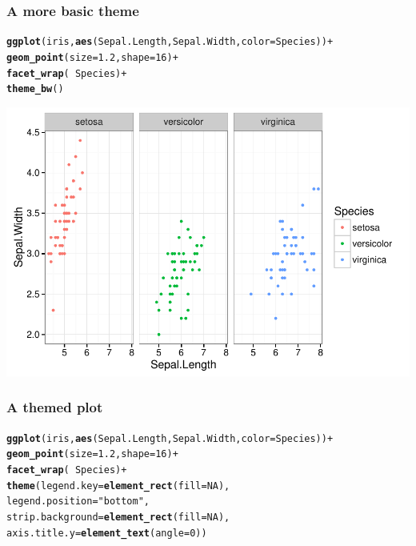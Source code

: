 \documentclass{beamer}\usepackage[]{graphicx}\usepackage[]{color}
\makeatletter
\newcommand{\hlnum}[1]{\textcolor[rgb]{0.686,0.059,0.569}{#1}}%
\newcommand{\hlstr}[1]{\textcolor[rgb]{0.192,0.494,0.8}{#1}}%
\newcommand{\hlopt}[1]{\textcolor[rgb]{0,0,0}{#1}}%
\newcommand{\hlstd}[1]{\textcolor[rgb]{0.345,0.345,0.345}{#1}}%
\newcommand{\hlkwc}[1]{\textcolor[rgb]{0.333,0.667,0.333}{#1}}%
\newcommand{\hlkwd}[1]{\textcolor[rgb]{0.737,0.353,0.396}{\textbf{#1}}}%
\newenvironment{kframe}{%
 \def\at@end@of@kframe{}%
 \ifinner\ifhmode%
  \def\at@end@of@kframe{\end{minipage}}%
  \begin{minipage}{\columnwidth}%
 \fi\fi%
 \def\FrameCommand##1{\hskip\@totalleftmargin \hskip-\fboxsep
 \colorbox{shadecolor}{##1}\hskip-\fboxsep
     \hskip-\linewidth \hskip-\@totalleftmargin \hskip\columnwidth}%
 \MakeFramed {\advance\hsize-\width
   \@totalleftmargin\z@ \linewidth\hsize
   \@setminipage}}%
 {\par\unskip\endMakeFramed%
 \at@end@of@kframe}
\newenvironment{knitrout}{}{} %
\makeatother
\begin{document}

\begin{frame}[fragile]
\frametitle{A more basic theme}
\begin{knitrout}\footnotesize
{}\color{fgcolor}\begin{kframe}
\begin{alltt}
\hlkwd{ggplot}\hlstd{(iris,} \hlkwd{aes}\hlstd{(Sepal.Length, Sepal.Width,} \hlkwc{color} \hlstd{= Species))} \hlopt{+}
    \hlkwd{geom_point}\hlstd{(}\hlkwc{size} \hlstd{=} \hlnum{1.2}\hlstd{,} \hlkwc{shape} \hlstd{=} \hlnum{16}\hlstd{)} \hlopt{+}
    \hlkwd{facet_wrap}\hlstd{(} \hlopt{~} \hlstd{Species)} \hlopt{+}
    \hlkwd{theme_bw}\hlstd{()}
\end{alltt}
\end{kframe}

{\centering \includegraphics[width=.75\linewidth]{figure/facet_wrapbw_theme-1} 

}



\end{knitrout}
\end{frame}


\begin{frame}[fragile]
\frametitle{A themed plot}
\begin{knitrout}\footnotesize
{}\color{fgcolor}\begin{kframe}
\begin{alltt}
\hlkwd{ggplot}\hlstd{(iris,} \hlkwd{aes}\hlstd{(Sepal.Length, Sepal.Width,} \hlkwc{color} \hlstd{= Species))} \hlopt{+}
    \hlkwd{geom_point}\hlstd{(}\hlkwc{size} \hlstd{=} \hlnum{1.2}\hlstd{,} \hlkwc{shape} \hlstd{=} \hlnum{16}\hlstd{)} \hlopt{+}
    \hlkwd{facet_wrap}\hlstd{(} \hlopt{~} \hlstd{Species)} \hlopt{+}
    \hlkwd{theme}\hlstd{(}\hlkwc{legend.key} \hlstd{=} \hlkwd{element_rect}\hlstd{(}\hlkwc{fill} \hlstd{=} \hlnum{NA}\hlstd{),}
        \hlkwc{legend.position} \hlstd{=} \hlstr{"bottom"}\hlstd{,}
        \hlkwc{strip.background} \hlstd{=} \hlkwd{element_rect}\hlstd{(}\hlkwc{fill} \hlstd{=} \hlnum{NA}\hlstd{),}
        \hlkwc{axis.title.y} \hlstd{=} \hlkwd{element_text}\hlstd{(}\hlkwc{angle} \hlstd{=} \hlnum{0}\hlstd{))}
\end{alltt}
\end{kframe}
\end{knitrout}
\end{frame}
\end{document}
